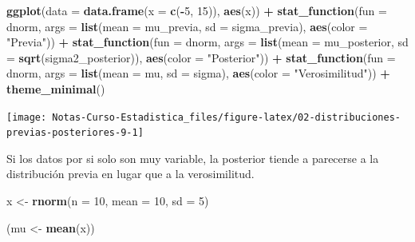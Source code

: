 \documentclass[
  12pt,
]{book}
\newenvironment{Shaded}{\begin{snugshade}}{\end{snugshade}}
\newcommand{\DataTypeTok}[1]{\textcolor[rgb]{0.13,0.29,0.53}{#1}}
\newcommand{\DecValTok}[1]{\textcolor[rgb]{0.00,0.00,0.81}{#1}}
\newcommand{\KeywordTok}[1]{\textcolor[rgb]{0.13,0.29,0.53}{\textbf{#1}}}
\newcommand{\NormalTok}[1]{#1}
\newcommand{\OperatorTok}[1]{\textcolor[rgb]{0.81,0.36,0.00}{\textbf{#1}}}
\newcommand{\StringTok}[1]{\textcolor[rgb]{0.31,0.60,0.02}{#1}}
\begin{document}
\begin{Shaded}
\begin{Highlighting}[]
\KeywordTok{ggplot}\NormalTok{(}\DataTypeTok{data =} \KeywordTok{data.frame}\NormalTok{(}\DataTypeTok{x =} \KeywordTok{c}\NormalTok{(}\OperatorTok{{-}}\DecValTok{5}\NormalTok{, }\DecValTok{15}\NormalTok{)), }\KeywordTok{aes}\NormalTok{(x)) }\OperatorTok{+}
\StringTok{  }\KeywordTok{stat\_function}\NormalTok{(}\DataTypeTok{fun =}\NormalTok{ dnorm, }\DataTypeTok{args =} \KeywordTok{list}\NormalTok{(}\DataTypeTok{mean =}\NormalTok{ mu\_previa, }\DataTypeTok{sd =}\NormalTok{ sigma\_previa), }\KeywordTok{aes}\NormalTok{(}\DataTypeTok{color =} \StringTok{"Previa"}\NormalTok{)) }\OperatorTok{+}
\StringTok{  }\KeywordTok{stat\_function}\NormalTok{(}\DataTypeTok{fun =}\NormalTok{ dnorm, }\DataTypeTok{args =} \KeywordTok{list}\NormalTok{(}\DataTypeTok{mean =}\NormalTok{ mu\_posterior, }\DataTypeTok{sd =} \KeywordTok{sqrt}\NormalTok{(sigma2\_posterior)), }\KeywordTok{aes}\NormalTok{(}\DataTypeTok{color =} \StringTok{"Posterior"}\NormalTok{)) }\OperatorTok{+}
\StringTok{  }\KeywordTok{stat\_function}\NormalTok{(}\DataTypeTok{fun =}\NormalTok{ dnorm, }\DataTypeTok{args =} \KeywordTok{list}\NormalTok{(}\DataTypeTok{mean =}\NormalTok{ mu, }\DataTypeTok{sd =}\NormalTok{ sigma), }\KeywordTok{aes}\NormalTok{(}\DataTypeTok{color =} \StringTok{"Verosimilitud"}\NormalTok{)) }\OperatorTok{+}
\StringTok{  }\KeywordTok{theme\_minimal}\NormalTok{()}
\end{Highlighting}
\end{Shaded}

\begin{center}\texttt{[image: Notas-Curso-Estadistica\_files/figure-latex/02-distribuciones-previas-posteriores-9-1]} \end{center}

Si los datos por si solo son muy variable, la posterior tiende a parecerse a la
distribución previa en lugar que a la verosimilitud.

\begin{Shaded}
\begin{Highlighting}[]
\NormalTok{x \textless{}{-}}\StringTok{ }\KeywordTok{rnorm}\NormalTok{(}\DataTypeTok{n =} \DecValTok{10}\NormalTok{, }\DataTypeTok{mean =} \DecValTok{10}\NormalTok{, }\DataTypeTok{sd =} \DecValTok{5}\NormalTok{)}

\NormalTok{(mu \textless{}{-}}\StringTok{ }\KeywordTok{mean}\NormalTok{(x))}
\end{Highlighting}
\end{Shaded}
\end{document}
